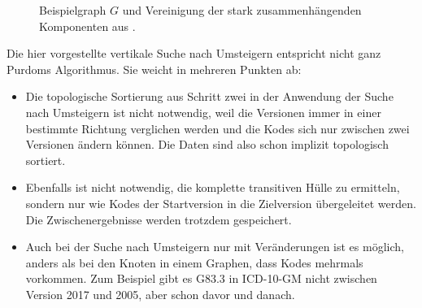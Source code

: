 \begin{figure}[H]
    \centering
    \setlength{\fboxsep}{10pt}\color{black!20}
    \normalcolor\caption{Beispielgraph $G$ und Vereinigung der stark zusammenhängenden Komponenten aus \cite[Seite 78]{purdom1970transitive}.}\vspace{-1.9em}
\end{figure}

Die hier vorgestellte vertikale Suche nach Umsteigern entspricht nicht ganz Purdoms Algorithmus. Sie weicht in mehreren Punkten ab:

\begin{itemize}
\item Die topologische Sortierung aus Schritt zwei in der Anwendung der Suche nach Umsteigern ist nicht notwendig, weil die Versionen immer in einer bestimmte Richtung verglichen werden und die Kodes sich nur zwischen zwei Versionen ändern können. Die Daten sind also schon implizit topologisch sortiert.
\item Ebenfalls ist nicht notwendig, die komplette transitiven Hülle zu ermitteln, sondern nur wie Kodes der Startversion in die Zielversion übergeleitet werden. Die Zwischenergebnisse werden trotzdem gespeichert. 
\item Auch bei der Suche nach Umsteigern nur mit Veränderungen ist es möglich, anders als bei den Knoten in einem Graphen, dass Kodes mehrmals vorkommen. Zum Beispiel gibt es G83.3 in ICD-10-GM nicht zwischen Version 2017 und 2005, aber schon davor und danach.  
\end{itemize} 


